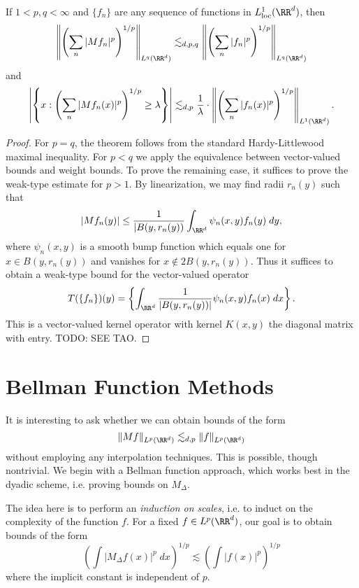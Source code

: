 \begin{theorem}
  If $1 < p,q < \infty$  and $\{ f_n \}$ are any sequence of functions in $L^1_{\text{loc}}(\RR^d)$, then
  \[ \left\| \left( \sum_n |Mf_n|^p \right)^{1/p} \right\|_{L^q(\RR^d)} \lesssim_{d,p,q} \left\| \left( \sum_n |f_n|^p \right)^{1/p} \right\|_{L^q(\RR^d)} \]
  and
  \[ \left| \left\{ x : \left( \sum_n |Mf_n(x)|^p \right)^{1/p} \geq \lambda \right\} \right| \lesssim_{d,p} \frac{1}{\lambda} \cdot \left\| \left( \sum_n |f_n(x)|^p \right)^{1/p} \right\|_{L^1(\RR^d)}. \]
\end{theorem}
\begin{proof}
  For $p = q$, the theorem follows from the standard Hardy-Littlewood maximal inequality. For $p < q$ we apply the equivalence between vector-valued bounds and weight bounds. To prove the remaining case, it suffices to prove the weak-type estimate for $p > 1$. By linearization, we may find radii $r_n(y)$ such that
  \[ |Mf_n(y)| \leq \frac{1}{|B(y,r_n(y))} \int_{\RR^d} \psi_n(x,y) f_n(y)\; dy, \]
  where $\psi_n(x,y)$ is a smooth bump function which equals one for $x \in B(y,r_n(y))$ and vanishes for $x \not \in 2B(y,r_n(y))$. Thus it suffices to obtain a weak-type bound for the vector-valued operator
  \[ T(\{ f_n \})(y) = \left\{ \int_{\RR^d} \frac{1}{|B(y,r_n(y))|} \psi_n(x,y) f_n(x)\; dx \right\}. \]
  This is a vector-valued kernel operator with kernel $K(x,y)$ the diagonal matrix with entry. TODO: SEE TAO.
\end{proof}





\chapter{Bellman Function Methods}

It is interesting to ask whether we can obtain bounds of the form
%
\[ \| M f \|_{L^p(\RR^d)} \lesssim_{d,p} \| f \|_{L^p(\RR^d)} \]
%
without employing any interpolation techniques. This is possible, though nontrivial. We begin with a Bellman function approach, which works best in the dyadic scheme, i.e. proving bounds on $M_\Delta$.

The idea here is to perform an \emph{induction on scales}, i.e. to induct on the complexity of the function $f$. For a fixed $f \in L^p(\RR^d)$, our goal is to obtain bounds of the form
%
\[ \left( \int |M_\Delta f(x)|^p\; dx \right)^{1/p} \lesssim \left( \int |f(x)|^p \right)^{1/p} \]
%
where the implicit constant is independent of $p$.

